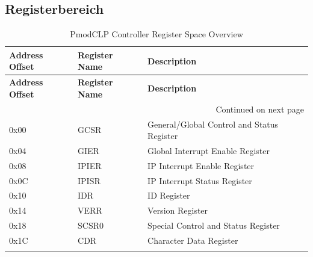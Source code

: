 \subsection{Registerbereich}
\begin{longtable}{|p{3cm}|p{3cm}|p{8cm}|}
    \hline
    \textbf{Address Offset} & \textbf{Register Name} & \textbf{Description} \\
    \hline
    \endfirsthead
    \hline
    \textbf{Address Offset} & \textbf{Register Name} & \textbf{Description} \\
    \hline
    \endhead
    \hline \multicolumn{3}{|r|}{{Continued on next page}} \\ \hline
    \endfoot
    \hline
    \endlastfoot
    
    0x00 & GCSR & General/Global Control and Status Register \\
    \hline
    0x04 & GIER & Global Interrupt Enable Register \\
    \hline
    0x08 & IPIER & IP Interrupt Enable Register \\
    \hline
    0x0C & IPISR & IP Interrupt Status Register \\
    \hline
    0x10 & IDR & ID Register \\
    \hline
    0x14 & VERR & Version Register \\
    \hline
    0x18 & SCSR0 & Special Control and Status Register \\
    \hline
    0x1C & CDR & Character Data Register \\
    \hline
    \caption{PmodCLP Controller Register Space Overview}
    \label{tab:register_overview}
    \end{longtable}
    
